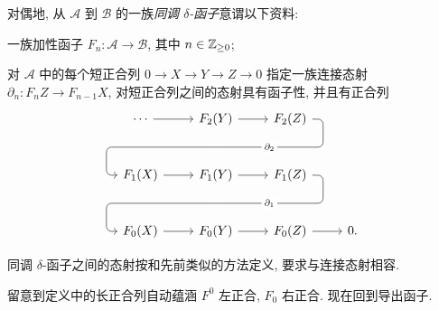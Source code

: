 \begin{definition}
	对偶地, 从 $\mathcal{A}$ 到 $\mathcal{B}$ 的一族\emph{同调 $\delta$-函子}意谓以下资料:
	\begin{compactitem}
		\item 一族加性函子 $F_n: \mathcal{A} \to \mathcal{B}$, 其中 $n \in \mathbb{Z}_{\geq 0}$;
		\item 对 $\mathcal{A}$ 中的每个短正合列 $0 \to X \to Y \to Z \to 0$ 指定一族连接态射 $\partial_n: F_n Z \to F_{n-1} X$, 对短正合列之间的态射具有函子性, 并且有正合列
		\begin{equation*}\begin{tikzcd}[row sep=large]
			\cdots \arrow[r] & F_2(Y) \arrow[r] \arrow[phantom, d, ""{coordinate, name=A}] & F_2(Z) \arrow[dll, rounded corners, "{\partial_2}" description, to path={
				-- ([xshift=2ex]\tikztostart.east)
				|- (A) [near end]\tikztonodes
				-| ([xshift=-2ex]\tikztotarget.west)
				-- (\tikztotarget)}] & \\
			F_1(X) \arrow[r] & F_1(Y) \arrow[r] \arrow[phantom, d, ""{coordinate, name=B}] & F_1(Z) \arrow[dll, rounded corners, "{\partial_1}" description, to path={
				-- ([xshift=2ex]\tikztostart.east)
				|- (B) [near end]\tikztonodes
				-| ([xshift=-2ex]\tikztotarget.west)
				-- (\tikztotarget)}] & \\
			F_0 (X) \arrow[r] & F_0 (Y) \arrow[r] & F_0 (Z) \arrow[r] & 0.
		\end{tikzcd}\end{equation*}
	\end{compactitem}
	同调 $\delta$-函子之间的态射按和先前类似的方法定义, 要求与连接态射相容.
\end{definition}

留意到定义中的长正合列自动蕴涵 $F^0$ 左正合, $F_0$ 右正合. 现在回到导出函子.

